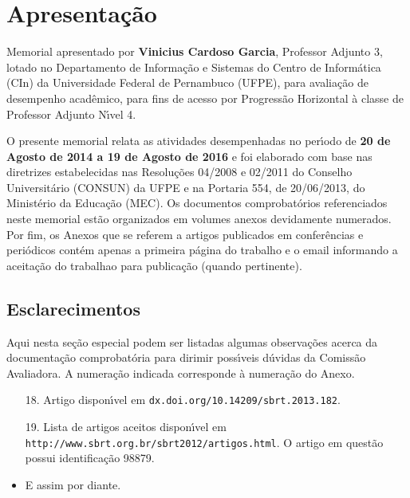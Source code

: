 \documentclass[a4paper,oneside,10pt]{article}
\newcounter{document}%
\begin{document}

\newpage
\section*{Apresenta\c{c}\~{a}o}
\vspace{0.3cm}

\begin{onehalfspace}

Memorial apresentado por \textbf{Vinicius Cardoso Garcia}, Professor Adjunto 3, lotado no Departamento de Informa\c{c}\~{a}o e Sistemas do Centro de Inform\'{a}tica (CIn) da Universidade Federal de Pernambuco (UFPE), para avalia\c{c}\~{a}o de desempenho acad\^{e}mico, para fins de acesso por Progress\~{a}o Horizontal \`{a} classe de Professor Adjunto N\'{\i}vel 4.

O presente memorial relata as atividades desempenhadas no per\'{\i}odo de \textbf{20 de Agosto de 2014 a 19 de Agosto de 2016} e foi elaborado com base nas diretrizes estabelecidas nas Resolu\c{c}\~{o}es 04/2008 e 02/2011 do Conselho Universit\'{a}rio (CONSUN) da UFPE e na Portaria 554, de 20/06/2013, do Minist\'{e}rio da Educa\c{c}\~{a}o (MEC). Os documentos comprobat\'{o}rios referenciados neste memorial est\~{a}o organizados em volumes anexos devidamente numerados. Por fim, os Anexos que se referem a artigos publicados em confer\^{e}ncias e peri\'{o}dicos cont\'{e}m apenas a primeira p\'{a}gina do trabalho e o email informando a aceita\c{c}\~{a}o do trabalhao para publica\c{c}\~{a}o (quando pertinente).

\end{onehalfspace}

\subsection*{Esclarecimentos}

Aqui nesta seção especial podem ser listadas algumas observa\c{c}\~{o}es acerca da documenta\c{c}\~{a}o comprobat\'{o}ria para dirimir poss\'{\i}veis d\'{u}vidas da Comiss\~{a}o Avaliadora. A numera\c{c}\~{a}o indicada corresponde \`{a} numera\c{c}\~{a}o do Anexo.

\begin{itemize}

\item [18.] Artigo dispon\'{\i}vel em \verb"dx.doi.org/10.14209/sbrt.2013.182".
\item [19.] Lista de artigos aceitos dispon\'{\i}vel em \verb"http://www.sbrt.org.br/sbrt2012/artigos.html". O artigo em quest\~{a}o possui identifica\c{c}\~{a}o 98879.
\item E assim por diante.

\end{itemize}
\end{document}
